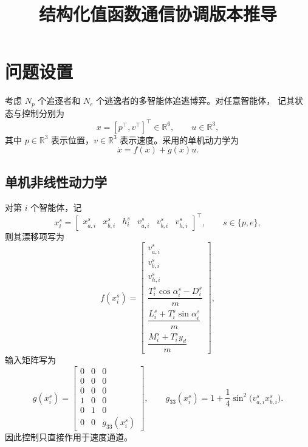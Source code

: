 \documentclass[11pt,a4paper]{article}
\title{结构化值函数通信协调版本推导}
\author{}
\date{}
\newcommand{\R}{\mathbb{R}}
\begin{document}
\maketitle

\section{问题设置}

考虑 $N_p$ 个追逐者和 $N_e$ 个逃逸者的多智能体追逃博弈。对任意智能体，
记其状态与控制分别为
\begin{equation}
x = [p^\top,v^\top]^\top \in \R^6,
\qquad
u \in \R^3,
\end{equation}
其中 $p\in\R^3$ 表示位置，$v\in\R^3$ 表示速度。采用的单机动力学为
\begin{equation}
\dot x = f(x)+g(x)u.
\label{eq:single_dynamics}
\end{equation}

\subsection{单机非线性动力学}

对第 $i$ 个智能体，记
\begin{equation}
x_i^s=
\begin{bmatrix}
x_{a,i}^s & x_{b,i}^s & h_i^s & v_{a,i}^s & v_{b,i}^s & v_{h,i}^s
\end{bmatrix}^{\!\top},
\qquad s\in\{p,e\},
\end{equation}
则其漂移项写为
\begin{equation}
f(x_i^s)=
\begin{bmatrix}
v_{a,i}^s\\
v_{b,i}^s\\
v_{h,i}^s\\
\dfrac{T_i^s\cos\alpha_i^s-D_i^s}{m}\\
\dfrac{L_i^s+T_i^s\sin\alpha_i^s}{m}\\
\dfrac{M_i^s+T_i^s y_d}{m}
\end{bmatrix},
\label{eq:f_single}
\end{equation}
输入矩阵写为
\begin{equation}
g(x_i^s)=
\begin{bmatrix}
0 & 0 & 0\\
0 & 0 & 0\\
0 & 0 & 0\\
1 & 0 & 0\\
0 & 1 & 0\\
0 & 0 & g_{33}(x_i^s)
\end{bmatrix},
\qquad
g_{33}(x_i^s)=1+\frac{1}{4}\sin^2\!\big(v_{a,i}^s x_{b,i}^s\big).
\label{eq:g_single}
\end{equation}
因此控制只直接作用于速度通道。
\end{document}
